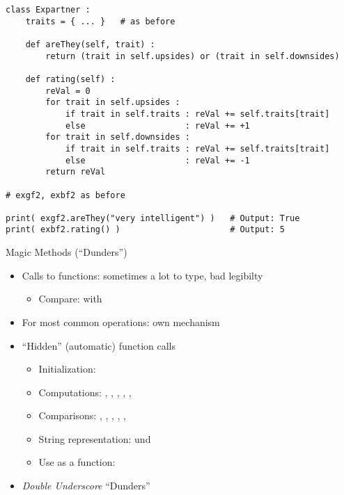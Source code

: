 \begin{frame}[fragile]
%
\vspace{-3pt}
\begin{codebox}
\begin{verbatim}
class Expartner :
    traits = { ... }   # as before
   
    def areThey(self, trait) :
        return (trait in self.upsides) or (trait in self.downsides)
    
    def rating(self) :
        reVal = 0
        for trait in self.upsides :
            if trait in self.traits : reVal += self.traits[trait]
            else                    : reVal += +1
        for trait in self.downsides :
            if trait in self.traits : reVal += self.traits[trait]
            else                    : reVal += -1
        return reVal

# exgf2, exbf2 as before

print( exgf2.areThey("very intelligent") )   # Output: True
print( exbf2.rating() )                      # Output: 5
\end{verbatim}
\end{codebox}
%
\end{frame}



\begin{frame}{Magic Methods (\enquote{Dunders})}
%
\begin{itemize}
\item Calls to functions: sometimes a lot to type, bad legibilty
	\begin{itemize}
	\item Compare:  with 
	\end{itemize}
\item[\Thus] For most common operations: own mechanism
\item \enquote{Hidden} (automatic) function calls
	\begin{itemize}
	\item Initialization: 
	\item Computations: , , , , , 
	\item Comparisons: , , , , , 
	\item String representation:  und 
	\item Use as a function: 
	\end{itemize}
\item \emph{Double Underscore} \Thus \enquote{Dunders}
\end{itemize}
%
\end{frame}

